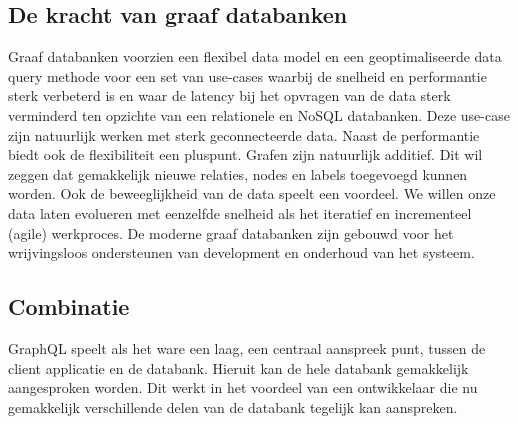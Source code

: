 \subsection{De kracht van graaf databanken}
Graaf databanken voorzien een flexibel data model en een geoptimaliseerde data query methode voor een set van use-cases waarbij de snelheid en performantie sterk verbeterd is en waar de latency bij het opvragen van de data sterk verminderd ten opzichte van een relationele en NoSQL databanken. Deze use-case zijn natuurlijk werken met sterk geconnecteerde data. %
Naast de performantie biedt ook de flexibiliteit een pluspunt. Grafen zijn natuurlijk additief. Dit wil zeggen dat gemakkelijk nieuwe relaties, nodes en labels toegevoegd kunnen worden.
Ook de beweeglijkheid van de data speelt een voordeel. We willen onze data laten evolueren met eenzelfde snelheid als het iteratief en incrementeel (agile) werkproces. De moderne graaf databanken zijn gebouwd voor het wrijvingsloos ondersteunen van development en onderhoud van het systeem. \autocite{graphDatabases}

\subsection{Combinatie}
GraphQL speelt als het ware een laag, een centraal aanspreek punt, tussen de client applicatie en de databank.  Hieruit kan de hele databank gemakkelijk aangesproken worden. Dit werkt in het voordeel van een ontwikkelaar die nu gemakkelijk verschillende delen van de databank tegelijk kan aanspreken.





